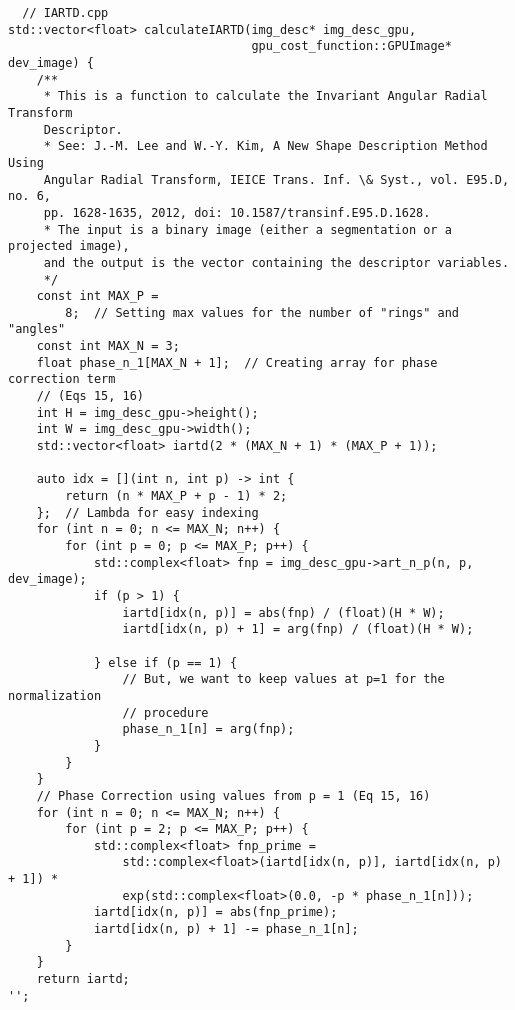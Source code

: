 \begin{lstlisting}
  // IARTD.cpp
std::vector<float> calculateIARTD(img_desc* img_desc_gpu,
                                  gpu_cost_function::GPUImage* dev_image) {
    /**
     * This is a function to calculate the Invariant Angular Radial Transform
     Descriptor.
     * See: J.-M. Lee and W.-Y. Kim, A New Shape Description Method Using
     Angular Radial Transform, IEICE Trans. Inf. \& Syst., vol. E95.D, no. 6,
     pp. 1628-1635, 2012, doi: 10.1587/transinf.E95.D.1628.
     * The input is a binary image (either a segmentation or a projected image),
     and the output is the vector containing the descriptor variables.
     */
    const int MAX_P =
        8;  // Setting max values for the number of "rings" and "angles"
    const int MAX_N = 3;
    float phase_n_1[MAX_N + 1];  // Creating array for phase correction term
    // (Eqs 15, 16)
    int H = img_desc_gpu->height();
    int W = img_desc_gpu->width();
    std::vector<float> iartd(2 * (MAX_N + 1) * (MAX_P + 1));

    auto idx = [](int n, int p) -> int {
        return (n * MAX_P + p - 1) * 2;
    };  // Lambda for easy indexing
    for (int n = 0; n <= MAX_N; n++) {
        for (int p = 0; p <= MAX_P; p++) {
            std::complex<float> fnp = img_desc_gpu->art_n_p(n, p, dev_image);
            if (p > 1) {
                iartd[idx(n, p)] = abs(fnp) / (float)(H * W);
                iartd[idx(n, p) + 1] = arg(fnp) / (float)(H * W);

            } else if (p == 1) {
                // But, we want to keep values at p=1 for the normalization
                // procedure
                phase_n_1[n] = arg(fnp);
            }
        }
    }
    // Phase Correction using values from p = 1 (Eq 15, 16)
    for (int n = 0; n <= MAX_N; n++) {
        for (int p = 2; p <= MAX_P; p++) {
            std::complex<float> fnp_prime =
                std::complex<float>(iartd[idx(n, p)], iartd[idx(n, p) + 1]) *
                exp(std::complex<float>(0.0, -p * phase_n_1[n]));
            iartd[idx(n, p)] = abs(fnp_prime);
            iartd[idx(n, p) + 1] -= phase_n_1[n];
        }
    }
    return iartd;
'';
\end{lstlisting}


